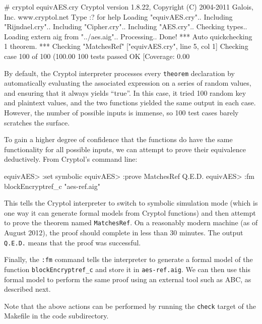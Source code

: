 \documentclass[11pt]{article}
\begin{document}
\begin{code}


# cryptol equivAES.cry
Cryptol version 1.8.22, Copyright (C) 2004-2011 Galois, Inc.
                                            www.cryptol.net 
Type :? for help
Loading "equivAES.cry"..
  Including "Rijndael.cry"..
  Including "Cipher.cry"..
  Including "AES.cry".. Checking types..
  Loading extern aig from "../aes.aig".. Processing.. Done!
*** Auto quickchecking 1 theorem.
*** Checking "MatchesRef" ["equivAES.cry", line 5, col 1]
Checking case 100 of 100 (100.00%
100 tests passed OK
[Coverage: 0.00%
\end{code}

By default, the Cryptol interpreter processes every \texttt{theorem}
declaration by automatically evaluating the associated expression on a
series of random values, and ensuring that it always yields ``true''.
In this case, it tried 100 random key and plaintext values, and the two
functions yielded the same output in each case. However, the number of
possible inputs is immense, so 100 test cases barely scratches the
surface.

To gain a higher degree of confidence that the functions do have the
same functionality for all possible inputs, we can attempt to prove
their equivalence deductively. From Cryptol's command line:

\begin{code}
equivAES> :set symbolic
equivAES> :prove MatchesRef
Q.E.D.
equivAES> :fm blockEncryptref_c "aes-ref.aig"
\end{code}

This tells the Cryptol interpreter to switch to symbolic simulation mode
(which is one way it can generate formal models from Cryptol functions)
and then attempt to prove the theorem named \texttt{MatchesRef}. On a
reasonably modern machine (as of August 2012), the proof should
complete in less than 30 minutes. The output \texttt{Q.E.D.} means that
the proof was successful.

Finally, the \texttt{:fm} command tells the interpreter to generate a
formal model of the function \texttt{blockEncryptref\_c} and store it in
\texttt{aes-ref.aig}. We can then use this formal model to perform the
same proof using an external tool such as ABC, as described next.

Note that the above actions can be performed by running the
\texttt{check} target of the Makefile in the code subdirectory.
\end{document}
